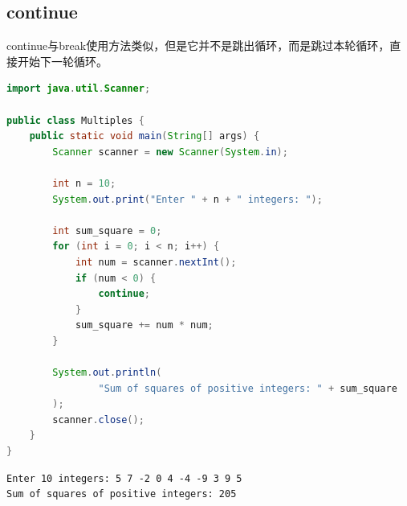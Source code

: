 \vspace{0.5cm}

\subsection{continue}

continue与break使用方法类似，但是它并不是跳出循环，而是跳过本轮循环，直接开始下一轮循环。\\


\begin{lstlisting}[language=Java]
import java.util.Scanner;

public class Multiples {
    public static void main(String[] args) {
        Scanner scanner = new Scanner(System.in);

        int n = 10;
        System.out.print("Enter " + n + " integers: ");

        int sum_square = 0;
        for (int i = 0; i < n; i++) {
            int num = scanner.nextInt();
            if (num < 0) {
                continue;
            }
            sum_square += num * num;
        }

        System.out.println(
                "Sum of squares of positive integers: " + sum_square
        );
        scanner.close();
    }
}
\end{lstlisting}

\begin{tcolorbox}
    \begin{verbatim}
Enter 10 integers: 5 7 -2 0 4 -4 -9 3 9 5
Sum of squares of positive integers: 205
\end{verbatim}
\end{tcolorbox}

\newpage